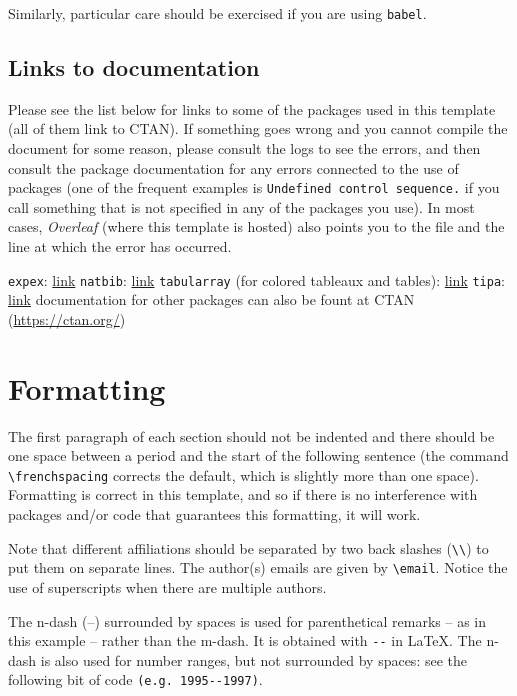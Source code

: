 \documentclass{article}
\begin{document}
Similarly, particular care should be exercised if you are using \verb=babel=.

\subsection{Links to documentation}
Please see the list below for links to some of the packages used in this template (all of them link to CTAN). If something goes wrong and you cannot compile the document for some reason, please consult the logs to see the errors, and then consult the package documentation for any errors connected to the use of packages (one of the frequent examples is \verb=Undefined control sequence.= if you call something that is not specified in any of the packages you use). In most cases, \textit{Overleaf} (where this template is hosted) also points you to the file and the line at which the error has occurred.

\pex
\a \verb=expex=: \href{https://ctan.org/pkg/expex?lang=en}{link}
\a \verb=natbib=: \href{https://ctan.org/pkg/natbib?lang=en}{link}
\a \verb=tabularray= (for colored tableaux and tables): \href{https://ctan.org/pkg/tabularray}{link}
\a \verb=tipa=: \href{https://ctan.org/pkg/tipa?lang=en}{link}
\a documentation for other packages can also be fount at CTAN (\href{https://ctan.org/}{https://ctan.org/})
\xe

\section{Formatting}
The first paragraph of each section should not be indented and there should be one space between a period and the start of the following sentence (the command \verb=\frenchspacing= corrects the default, which is slightly more than one space). Formatting is correct in this template, and so if there is no interference with packages and/or code that guarantees this formatting, it will work.

Note that different affiliations should be separated by two back slashes (\verb=\\=) to put them on separate lines. The author(s) emails are given by \verb=\email=. Notice the use of superscripts when there are multiple authors.

The n-dash (--) surrounded by spaces is used for parenthetical remarks -- as in this example -- rather than the m-dash. It is obtained with \verb=--= in LaTeX. The n-dash is also used for number ranges, but not surrounded by spaces: see the following bit of code \verb=(e.g. 1995--1997)=.
\end{document}
